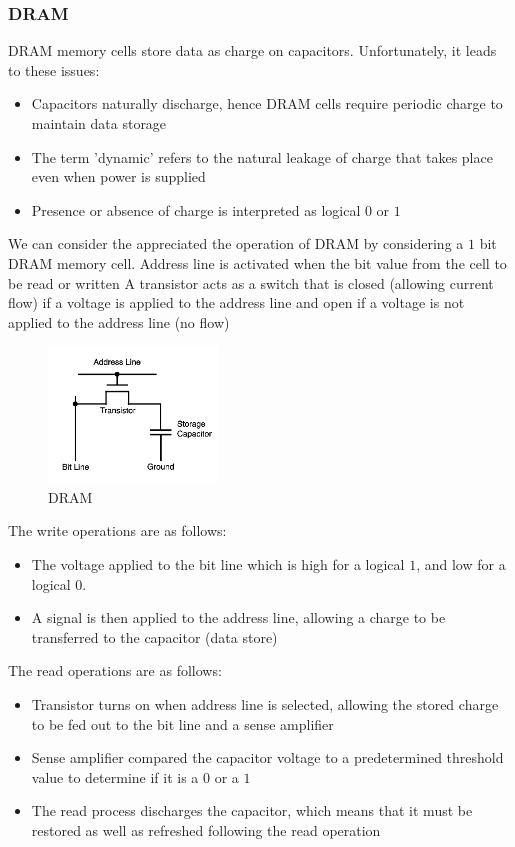 \documentclass[a4paper]{article}
\theoremstyle{plain}
\theoremstyle{definition}
\theoremstyle{remark}
\begin{document}
\subsubsection{DRAM}
DRAM memory cells store data as charge on capacitors. Unfortunately, it leads to these issues:
\begin{itemize}
	\item Capacitors naturally discharge, hence DRAM cells require periodic charge to maintain data storage
	\item The term 'dynamic' refers to the natural leakage of charge that takes place even when power is supplied
	\item Presence or absence of charge is interpreted as logical $0$ or $1$
\end{itemize}
We can consider the appreciated the operation of DRAM by considering a $1 $ bit DRAM memory cell.
Address line is activated when the bit value from the cell to be read or written
A transistor acts as a switch that is closed (allowing current flow) if a voltage is applied to the address line and open if a voltage is not applied to the address line (no flow)
\begin{figure}[H]
	\centering
	\includegraphics[width=0.4\textwidth]{figures/dram.png}
	\caption{DRAM}
	\label{fig:DRAM}
\end{figure}
The write operations are as follows:
\begin{itemize}
	\item The voltage applied to the bit line which is high for a logical $1$, and low for a logical $0$.
	\item A signal is then applied to the address line, allowing a charge to be transferred to the capacitor (data store)
\end{itemize}
The read operations are as follows:
\begin{itemize}
	\item Transistor turns on when address line is selected, allowing the stored charge to be fed out to the bit line and a sense amplifier
	\item Sense amplifier compared the capacitor voltage to a predetermined threshold value to determine if it is a $0$ or a $1$ 
	\item The read process discharges the capacitor, which means that it must be restored as well as refreshed following the read operation
\end{itemize}
\end{document}

